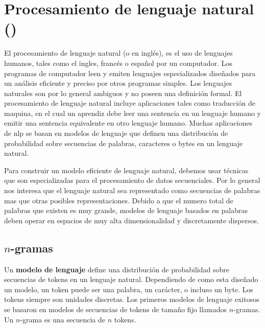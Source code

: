 
\section{Procesamiento de lenguaje natural ()}

El procesamiento de lenguaje natural (o  en inglés), es el uso de lenguajes humanos, tales como el ingles, francés o español por un computador. Los programas de computador leen y emiten lenguajes especializados diseñados para un análisis eficiente y preciso por otros programas simples. Los lenguajes naturales son por lo general ambiguos y no poseen una definición formal. El procesamiento de lenguaje natural incluye aplicaciones tales como traducción de maquina, en el cual un aprendiz debe leer una sentencia en un lenguaje humano y emitir una sentencia equivalente en otro lenguaje humano. Muchas aplicaciones de \gls{nlp} se basan en modelos de lenguaje que definen una distribución de probabilidad sobre secuencias de palabras, caracteres o bytes en un lenguaje natural.

Para construir un modelo eficiente de lenguaje natural, debemos usar técnicas que son especializadas para el procesamiento de datos secuenciales. Por lo general nos interesa que el lenguaje natural sea representado como secuencias de palabras mas que otras posibles representaciones. Debido a que el numero total de palabras que existen es muy grande, modelos de lenguaje basados en palabras deben operar en espacios de muy alta dimensionalidad y discretamente dispersos.

\subsection{$n$-gramas}
Un \textbf{modelo de lenguaje} define una distribución de probabilidad sobre secuencias de tokens en un lenguaje natural. Dependiendo de como esta diseñado un modelo, un token puede ser una palabra, un carácter, o incluso un byte. Los tokens siempre son unidades discretas. Los primeros modelos de lenguaje exitosos se basaron en modelos de secuencias de tokens de tamaño fijo llamados $n$-gramas. Un $n$-grama es una secuencia de $n$ tokens.

